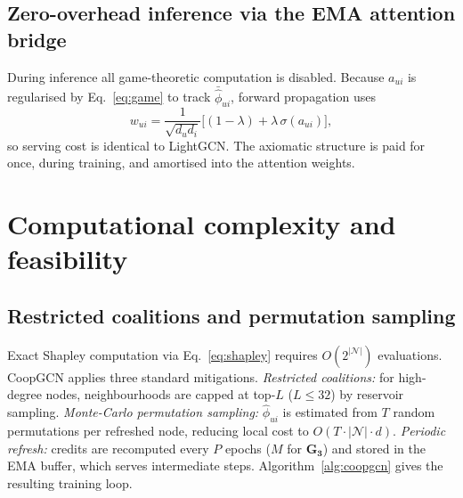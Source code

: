 \documentclass[final,5p,times,twocolumn]{elsarticle}
\begin{document}
\subsection{Zero-overhead inference via the EMA attention bridge}
\label{sec:zero}

During inference all game-theoretic computation is disabled. Because $a_{ui}$
is regularised by Eq.~\eqref{eq:game} to track $\bar{\hat{\phi}}_{ui}$,
forward propagation uses
\begin{equation}
w_{ui} = \frac{1}{\sqrt{d_u d_i}}
\bigl[(1-\lambda) + \lambda\, \sigma(a_{ui})\bigr],
\end{equation}
so serving cost is identical to LightGCN. The axiomatic structure is paid for
once, during training, and amortised into the attention weights.

\section{Computational complexity and feasibility}
\label{sec:complexity}

\subsection{Restricted coalitions and permutation sampling}
\label{sec:restrict}

Exact Shapley computation via Eq.~\eqref{eq:shapley} requires
$O(2^{|\mathcal{N}|})$ evaluations. CoopGCN applies three standard
mitigations. \emph{Restricted coalitions:} for high-degree nodes,
neighbourhoods are capped at top-$L$ ($L \le 32$) by reservoir sampling.
\emph{Monte-Carlo permutation sampling:} $\hat{\phi}_{ui}$ is estimated from
$T$ random permutations per refreshed node, reducing local cost to $O(T \cdot
|\mathcal{N}| \cdot d)$. \emph{Periodic refresh:} credits are recomputed every
$P$ epochs ($M$ for $\mathbf{G_3}$) and stored in the EMA buffer, which serves
intermediate steps. Algorithm~\ref{alg:coopgcn} gives the resulting training
loop.
\end{document}
